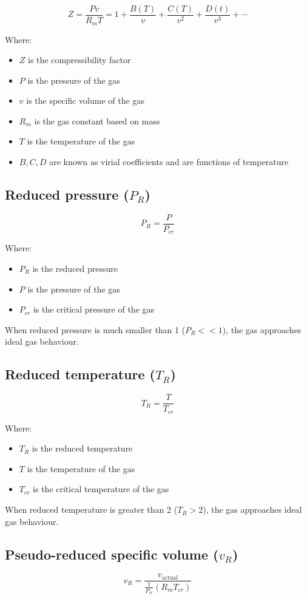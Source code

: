 \documentclass[11pt]{article}
\begin{document}
\[Z = \frac{Pv}{R_m T} = 1 + \frac{B(T)}{v} + \frac{C(T)}{v^2} + \frac{D(t)}{v^3} + \cdots\]

Where:
\begin{itemize}
\item \(Z\) is the compressibility factor
\item \(P\) is the pressure of the gas
\item \(v\) is the specific volume of the gas
\item \(R_m\) is the gas constant based on mass
\item \(T\) is the temperature of the gas
\item \(B, C, D\) are known as virial coefficients and are functions of temperature
\end{itemize}
\subsection{Reduced pressure (\(P_R\))}
\label{sec:org2b1d09d}
\[P_R = \frac{P}{P_{cr}}\]

Where:
\begin{itemize}
\item \(P_R\) is the reduced pressure
\item \(P\) is the pressure of the gas
\item \(P_{cr}\) is the critical pressure of the gas
\end{itemize}

When reduced pressure is much smaller than 1 (\(P_R << 1\)), the gas approaches ideal gas behaviour.
\subsection{Reduced temperature (\(T_R\))}
\label{sec:orgac4b712}
\[T_R = \frac{T}{T_{cr}}\]

Where:
\begin{itemize}
\item \(T_R\) is the reduced temperature
\item \(T\) is the temperature of the gas
\item \(T_{cr}\) is the critical temperature of the gas
\end{itemize}

When reduced temperature is greater than 2 (\(T_R > 2\)), the gas approaches ideal gas behaviour.
\subsection{Pseudo-reduced specific volume (\(v_R\))}
\label{sec:org537b6c0}
\[v_R = \frac{v_{\text{actual}}}{\frac{1}{P_{cr}} \left(R_m T_{cr} \right)}\]
\end{document}
